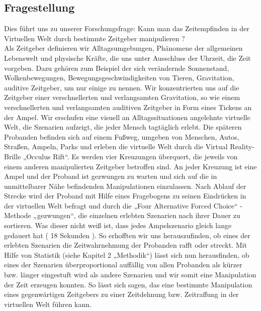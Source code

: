 \documentclass{Paper}
\begin{document}
\subsection{Fragestellung }
Dies führt uns zu unserer Forschungsfrage: Kann man das Zeitempfinden in der Virtuellen Welt durch bestimmte Zeitgeber manipulieren ?\\
Als Zeitgeber definieren wir Alltagsumgebungen, Phänomene der allgemeinen Lebenswelt und physische Kräfte, die uns unter Ausschluss der Uhrzeit, die Zeit vorgeben. Dazu gehören zum Beispiel der sich verändernde Sonnenstand, Wolkenbewegungen, Bewegungsgeschwindigkeiten von Tieren, Gravitation, auditive Zeitgeber, um nur einige zu nennen. Wir konzentrierten uns auf die Zeitgeber einer verschnellerten und verlangsamten Gravitation, so wie einem verschnellerten und verlangsamten auditiven Zeitgeber in Form eines Tickens an der Ampel. Wir erschufen eine visuell an Alltagssituationen angelehnte virtuelle Welt, die Szenarien aufzeigt, die jeder Mensch tagtäglich erlebt. Die späteren Probanden befinden sich auf einem Fußweg, umgeben von Menschen, Autos, Straßen, Ampeln, Parks und erleben die virtuelle Welt durch die Virtual Reality-Brille „Occulus Rift“. Es werden vier Kreuzungen überquert, die jeweils von einem anderen manipulierten Zeitgeber betroffen sind. An jeder Kreuzung ist eine Ampel und der Proband ist gezwungen zu warten und sich auf die in unmittelbarer Nähe befindenden Manipulationen einzulassen. Nach Ablauf der Strecke wird der Proband mit Hilfe eines Fragebogens zu seinen Eindrücken in der virtuellen Welt befragt und durch die „Four Alternative Forced Choice“ - Methode „gezwungen“, die einzelnen erlebten Szenarien nach ihrer Dauer zu sortieren. Was dieser nicht weiß ist, dass jedes Ampelszenario gleich lange gedauert hat ( 18 Sekunden ). So erhofften wir uns herauszufinden, ob eines der erlebten Szenarien die Zeitwahrnehmung der Probanden rafft oder streckt. Mit Hilfe von Statistik (siehe Kapitel 2 „Methodik“) lässt sich nun herausfinden, ob eines der Szenarien überproportional auffällig von allen Probanden als kürzer bzw. länger eingestuft wird als andere Szenarien und wir somit eine Manipulation der Zeit erzeugen konnten. So lässt sich sagen, das eine bestimmte Manipulation eines gegenwärtigen Zeitgebers zu einer Zeitdehnung bzw. Zeitraffung in der virtuellen Welt führen kann. 
\par
\end{document}
